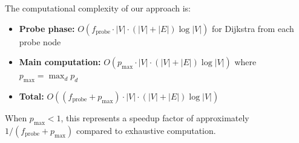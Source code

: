\documentclass[11pt,a4paper]{article}
\begin{document}
The computational complexity of our approach is:
\begin{itemize}
    \item \textbf{Probe phase:} $O(f_{\text{probe}} \cdot |V| \cdot (|V| + |E|) \log |V|)$ for Dijkstra from each probe node
    \item \textbf{Main computation:} $O(p_{\max} \cdot |V| \cdot (|V| + |E|) \log |V|)$ where $p_{\max} = \max_d p_d$
    \item \textbf{Total:} $O((f_{\text{probe}} + p_{\max}) \cdot |V| \cdot (|V| + |E|) \log |V|)$
\end{itemize}

When $p_{\max} < 1$, this represents a speedup factor of approximately $1 / (f_{\text{probe}} + p_{\max})$ compared to exhaustive computation.



\end{document}
